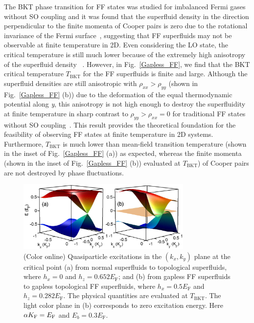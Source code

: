 \documentclass[prl,aps,twocolumn,showpacs, floatfix]{revtex4}
\begin{document}
The BKT phase transition for FF states was studied for imbalanced Fermi
gases without SO coupling and it was found that the superfluid density in
the direction perpendicular to the finite momenta of Cooper pairs is zero
due to the rotational invariance of the Fermi surface~\cite{EZeroBKT},
suggesting that FF superfluids may not be observable at finite temperature
in 2D. Even considering the LO state, the critical temperature is still much
lower because of the extremely high anisotropy of the superfluid density~%
\cite{Vishwanath2009PRL}. However, in Fig.~\ref{Gapless_FF}, we find that
the BKT critical temperature $T_{\mathrm{BKT}}$ for the FF superfluids is
finite and large. Although the superfluid densities are still anisotropic
with $\rho _{xx}>\rho _{yy}$ (shown in Fig.~\ref{Gapless_FF} (b)) due to the
deformation of the equal thermodynamic potential along \textit{y}, this
anisotropy is not high enough to destroy the superfluidity at finite
temperature in sharp contrast to $\rho _{yy}>\rho _{xx}=0$ for traditional
FF states without SO coupling~\cite{Vishwanath2009PRL,Torma2014PRB}. This
result provides the theoretical foundation for the feasibility of observing
FF states at finite temperature in 2D systems. Furthermore, $T_{\mathrm{BKT}}
$ is much lower than mean-field transition temperature (shown in the inset
of Fig.~\ref{Gapless_FF} (a)) as expected, whereas the finite momenta (shown
in the inset of Fig.~\ref{Gapless_FF} (b)) evaluated at $T_{\mathrm{BKT}}$)
of Cooper pairs are not destroyed by phase fluctuations.


\begin{figure}[t]
\includegraphics[width=3.4in]{excitation.eps}
\caption{(Color online) Quasiparticle excitations in the $(k_{x},k_{y})$
plane at the critical point (a) from normal superfluids to topological
superfluids, where $h_{x}=0$ and $h_{z}=0.652E_{\mathrm{F}}$; and (b) from
gapless FF superfluids to gapless topological FF superfluids, where $%
h_{x}=0.5E_{\mathrm{F}}$ and $h_{z}=0.282E_{\mathrm{F}}$. The physical
quantities are evaluated at $T_{\mathrm{BKT}}$. The light color plane in (b)
corresponds to zero excitation energy. Here $\protect\alpha K_{\mathrm{F}%
}=E_{\mathrm{F}}$ and $E_{b}=0.3E_{\mathrm{F}}$.}
\label{excitation}
\end{figure}
\end{document}
